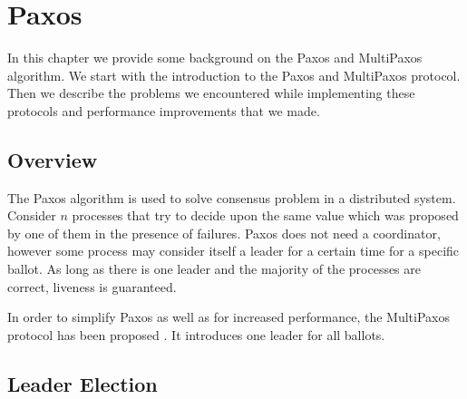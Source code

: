 \chapter{Paxos}

In this chapter we provide some background on the Paxos and MultiPaxos algorithm. We start with the introduction to the Paxos and MultiPaxos protocol. Then we describe the problems we encountered while implementing these protocols and performance improvements that we made.

\section{Overview}
The Paxos algorithm is used to solve consensus problem in a distributed system. Consider $n$ processes that try to decide upon the same value which was proposed by one of them in the presence of failures. Paxos does not need a coordinator, however some process may consider itself a leader for a certain time for a specific ballot. As long as there is one leader and the majority of the processes are correct, liveness is guaranteed.

In order to simplify Paxos as well as for increased performance, the MultiPaxos protocol has been proposed \cite{Lam01}. It introduces one leader for all ballots.









\section{Leader Election}
\label{sec:leader_election}
\indent\par

